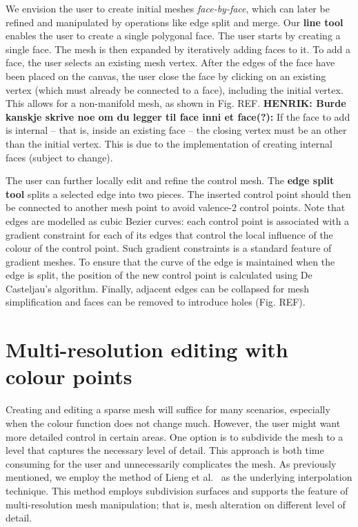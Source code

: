 \documentclass{egpubl}
\newcommand{\note}[3]{{\color{#2}\textbf{#1: #3}}}
\newcommand{\henrik}[1]{\note{HENRIK}{WildStrawberry}{#1}}
\begin{document}
We envision the user to create initial meshes \textit{face-by-face}, which can later be refined and manipulated by operations like edge split and merge. Our \textbf{line tool} enables the user to create a single polygonal face. The user starts by creating a single face. The mesh is then expanded by iteratively adding faces to it. To add a face, the user selects an existing mesh vertex. After the edges of the face have been placed on the canvas, the user close the face by clicking on an existing vertex (which must already be connected to a face), including the initial vertex. This allows for a non-manifold mesh, as shown in Fig. REF. \henrik{Burde kanskje skrive noe om du legger til face inni et face(?):} If the face to add is internal -- that is, inside an existing face -- the closing vertex must be an other than the initial vertex. This is due to the implementation of creating internal faces (subject to change).

The user can further locally edit and refine the control mesh. The \textbf{edge split tool} splits a selected edge into two pieces. The inserted control point should then be connected to another mesh point to avoid valence-2 control points. Note that edges are modelled as cubic Bezier curves: each control point is associated with a gradient constraint for each of its edges that control the local influence of the colour of the control point. Such gradient constraints is a standard feature of gradient meshes. To ensure that the curve of the edge is maintained when the edge is split, the position of the new control point is calculated using De Casteljau's algorithm. Finally, adjacent edges can be collapsed for mesh simplification and faces can be removed to introduce holes (Fig. REF).

\section{Multi-resolution editing with colour points}
\label{sec:DP}

Creating and editing a sparse mesh will suffice for many scenarios, especially when the colour function does not change much. However, the user might want more detailed control in certain areas. One option is to subdivide the mesh to a level that captures the necessary level of detail. This approach is both time consuming for the user and unnecessarily complicates the mesh. As previously mentioned, we employ the method of Lieng et al.~\cite{Lieng:2016} as the underlying interpolation technique. This method employs subdivision surfaces and supports the feature of multi-resolution mesh manipulation; that is, mesh alteration on different level of detail. 
\end{document}
